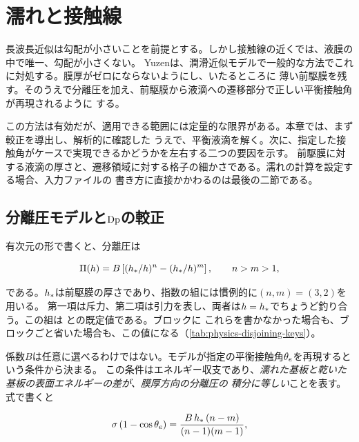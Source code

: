 \chapter{濡れと接触線}
\label{ch:wetting}

長波長近似は勾配が小さいことを前提とする。しかし接触線の近くでは、液膜の中で唯一、勾配が小さくない。
Yuzenは、潤滑近似モデルで一般的な方法でこれに対処する。膜厚がゼロにならないようにし、いたるところに
薄い前駆膜を残す。そのうえで分離圧を加え、前駆膜から液滴への遷移部分で正しい平衡接触角が再現されるように
する。

この方法は有効だが、適用できる範囲には定量的な限界がある。本章では、まず較正を導出し、解析的に確認した
うえで、平衡液滴を解く。次に、指定した接触角がケースで実現できるかどうかを左右する二つの要因を示す。
前駆膜に対する液滴の厚さと、遷移領域に対する格子の細かさである。濡れの計算を設定する場合、入力ファイルの
書き方に直接かかわるのは最後の二節である。

\section{分離圧モデルと\texorpdfstring{$\mathrm{Dp}$}{Dp}の較正}
\label{sec:wetting:dp}

有次元の形で書くと、分離圧は

\begin{equation}\label{eq:pi-dim}
  \Pi(h) = B \left[ (h_{*}/h)^{n} - (h_{*}/h)^{m} \right],
  \qquad n > m > 1,
\end{equation}

である。$h_{*}$は前駆膜の厚さであり、指数の組には慣例的に$(n,m) = (3,2)$を用いる。
第一項は斥力、第二項は引力を表し、両者は$h = h_{*}$でちょうど釣り合う。この組は
との既定値である。ブロックに
これらを書かなかった場合も、ブロックごと省いた場合も、この値になる（\cref{tab:physics-disjoining-keys}）。

係数$B$は任意に選べるわけではない。モデルが指定の平衡接触角$\theta_{e}$を再現するという条件から決まる。
この条件はエネルギー収支であり、\emph{濡れた基板と乾いた基板の表面エネルギーの差が、膜厚方向の分離圧の
積分に等しい}ことを表す。式で書くと

\begin{equation}\label{eq:energy-balance}
  \sigma\,(1 - \cos\theta_{e})
    = \frac{B\,h_{*}\,(n-m)}{(n-1)(m-1)},
\end{equation}

